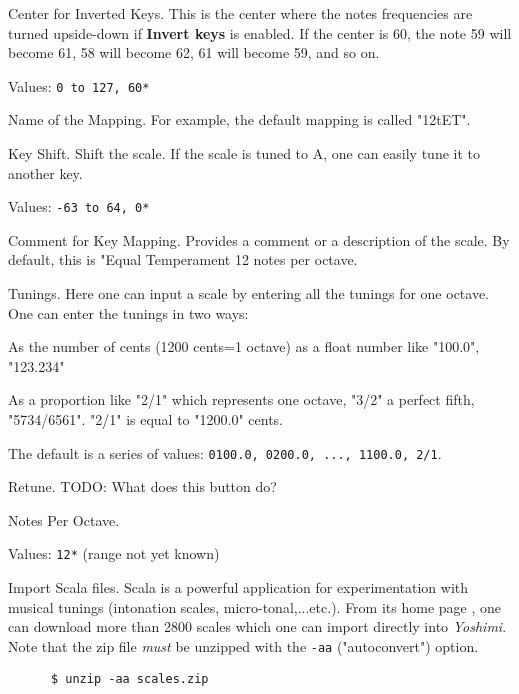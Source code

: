    Center for Inverted Keys.
   This is the center where the notes frequencies are turned upside-down if
   \textbf{Invert keys} is enabled.
   If the center is 60, the note 59 will become 61, 58 will become 62, 61
   will become 59, and so on.

   Values: \texttt{0 to 127, 60*}

   Name of the Mapping.
   For example, the default mapping is called "12tET".

   Key Shift.
   Shift the scale. If the scale is tuned to A, one can easily tune it to
   another key.

   Values: \texttt{-63 to 64, 0*}

   Comment for Key Mapping.
   Provides a comment or a description of the scale.
   By default, this is "Equal Temperament 12 notes per octave.

   Tunings.
   Here one can input a scale by entering all the tunings for one octave. 
   One can enter the tunings in two ways: 

   \begin{enumber}
      \item As the number of cents (1200 cents=1 octave) as a float number
      like "100.0", "123.234"
      \item As a proportion like "2/1" which represents one octave, "3/2" a
      perfect fifth, "5734/6561".  "2/1" is equal to "1200.0" cents.
   \end{enumber}

   The default is a series of values:
   \texttt{0100.0, 0200.0, ..., 1100.0, 2/1}.

   Retune.
   TODO:  What does this button do?

   Notes Per Octave.

   Values: \texttt{12*} (range not yet known)

   Import Scala files.
   Scala is a powerful application for experimentation with musical tunings
   (intonation scales, micro-tonal,...etc.). From its home page \cite{scala},
   one can download more than 2800 scales which one can import directly into
   \textsl{Yoshimi}.  Note that the zip file \textsl{must} be unzipped with
   the \texttt{-aa} ("autoconvert") option.

    \begin{verbatim}
      $ unzip -aa scales.zip
    \end{verbatim}

